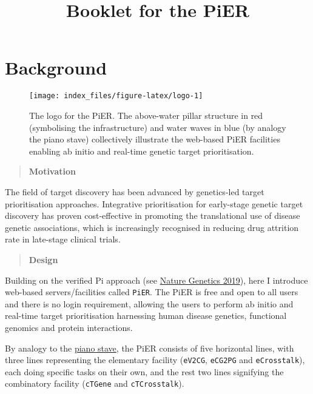 \documentclass[
  oneside]{book}
\title{Booklet for the PiER}
\author{}
\date{\vspace{-2.5em}}
\begin{document}
\maketitle

{
\setcounter{tocdepth}{2}
\tableofcontents
}
\hypertarget{index}{%
\chapter{Background}\label{index}}

\begin{figure}

{\centering \texttt{[image: index\_files/figure-latex/logo-1]} 

}

\caption{The logo for the PiER. The above-water pillar structure in red (symbolising the infrastructure) and water waves in blue (by analogy the piano stave) collectively illustrate the web-based PiER facilities enabling ab initio and real-time genetic target prioritisation.}\label{fig:logo}
\end{figure}

\begin{quote}
\textbf{Motivation}
\end{quote}

The field of target discovery has been advanced by genetics-led target prioritisation approaches. Integrative prioritisation for early-stage genetic target discovery has proven cost-effective in promoting the translational use of disease genetic associations, which is increasingly recognised in reducing drug attrition rate in late-stage clinical trials.

\begin{quote}
\textbf{Design}
\end{quote}

Building on the verified Pi approach (see \href{https://www.ncbi.nlm.nih.gov/pubmed/31253980}{Nature Genetics 2019}), here I introduce web-based servers/facilities called \texttt{PiER}. The PiER is free and open to all users and there is no login requirement, allowing the users to perform ab initio and real-time target prioritisation harnessing human disease genetics, functional genomics and protein interactions.

By analogy to the \href{https://www.piano-keyboard-guide.com/grand-staff.html}{piano stave}, the PiER consists of five horizontal lines, with three lines representing the elementary facility (\texttt{eV2CG}, \texttt{eCG2PG} and \texttt{eCrosstalk}), each doing specific tasks on their own, and the rest two lines signifying the combinatory facility (\texttt{cTGene} and \texttt{cTCrosstalk}).
\end{document}
